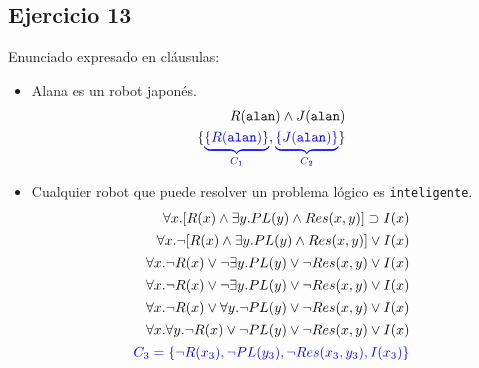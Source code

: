 \documentclass[10pt,a4paper]{article}
\begin{document}
\subsection{Ejercicio 13}
Enunciado expresado en cláusulas:

\begin{itemize}
    \item Alana es un robot japonés.
    \begin{align*}
    R(\texttt{alan})\land J(\texttt{alan}) \\
    \{{\color{blue}\underbrace{\{R(\texttt{alan})\}}_{C_1}},{\color{blue}\underbrace{\{J(\texttt{alan})\}}_{C_2}}\}
    \end{align*}
    \item Cualquier robot que puede resolver un problema lógico es \texttt{inteligente}.
    \begin{align*}
\forall x.[ R(x) \land \exists y. PL(y) \land Res(x,y)] \supset I(x) \\[1pt]
\forall x.\lnot [ R(x) \land \exists y. PL(y) \land Res(x,y)] \lor I(x) \\[1pt]
\forall x. \lnot R(x) \lor \lnot \exists y. PL(y) \lor \lnot Res(x,y) \lor I(x) \\[1pt]
\forall x. \lnot R(x) \lor \lnot \exists y. PL(y) \lor \lnot Res(x,y) \lor I(x) \\[1pt]
\forall x. \lnot R(x) \lor \forall y. \lnot PL(y) \lor \lnot Res(x,y) \lor I(x) \\[1pt]
\forall x.\forall y. \lnot R(x) \lor  \lnot PL(y) \lor \lnot Res(x,y) \lor I(x) \\[1pt]
{\color{blue}C_3 = \{ \lnot R(x_3),\lnot PL(y_3),\lnot Res(x_3,y_3) ,I(x_3) \}  }\\[1pt]
   \end{align*}
    

\end{itemize}
\end{document}
